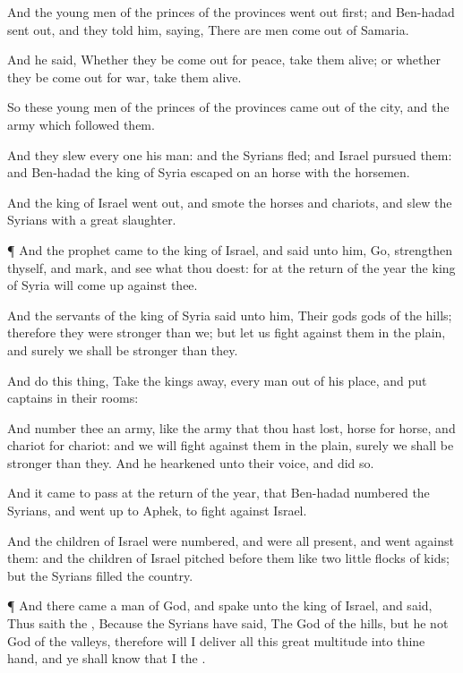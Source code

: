 {And the young
men of the
princes of the
provinces went
out
first; and
Ben-hadad sent
out, and they
told him,
saying, There are
men come
out of
Samaria.

And he
said, Whether they be come
out for
peace,
take them
alive; or whether they be come
out for
war,
take them
alive.

So these young
men of the
princes of the
provinces came
out of the
city, and the
army which
followed them.

And they
slew every
one his
man: and the
Syrians
fled; and
Israel
pursued them: and
Ben-hadad the
king of
Syria
escaped on an
horse with the
horsemen.

And the
king of
Israel went
out, and
smote the
horses and
chariots, and
slew the
Syrians with a
great
slaughter.


\par }{\PP {}¶ And the
prophet
came to the
king of
Israel, and
said unto him,
Go,
strengthen thyself, and
mark, and
see what thou
doest: for at the
return of the
year the
king of
Syria will come
up against thee.

And the
servants of the
king of
Syria
said unto him, Their
gods
{}
gods of the
hills; therefore they were
stronger than we;
but let us
fight against them in the
plain, and
surely we shall be
stronger than they.

And
do this
thing,
Take the
kings away, every
man out of his
place, and
put
captains in their rooms:

And
number thee an
army, like the
army that thou hast
lost,
horse for
horse, and
chariot for
chariot: and we will
fight
against them in the
plain,
{} surely we shall be
stronger than they. And he
hearkened unto their
voice, and did
so.

And it came to pass at the
return of the
year, that
Ben-hadad
numbered the
Syrians, and went
up to
Aphek, to
fight against
Israel.

And the
children of
Israel were
numbered, and were all
present, and
went
against them: and the
children of
Israel
pitched before them like
two little
flocks of
kids; but the
Syrians
filled the
country.


\par }{\PP {}¶ And there
came a
man of
God, and
spake unto the
king of
Israel, and
said, Thus
saith the
{}, Because the
Syrians have
said, The
{}
{}
God of the
hills, but he
{} not
God of the
valleys, therefore will I
deliver all this
great
multitude into thine
hand, and ye shall
know that I
{} the
{}.

}
